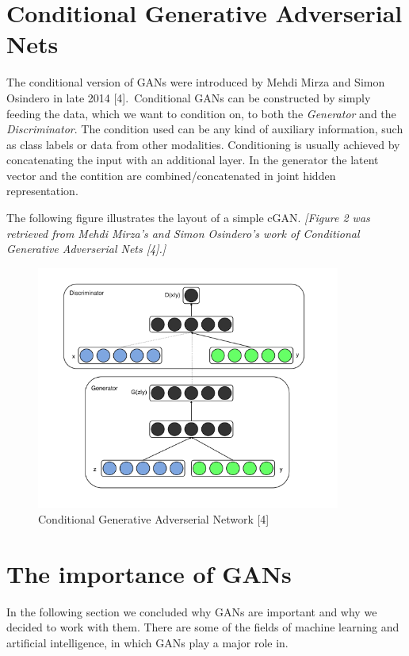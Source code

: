 \documentclass[lettersize,journal]{IEEEtran}
\begin{document}
\section{Conditional Generative Adverserial Nets}
The conditional version of GANs were introduced by Mehdi Mirza and Simon Osindero in late 2014 [4].\  Conditional GANs can be constructed by simply feeding the data, which we want to condition on, to both the \textit{Generator} and the \textit{Discriminator}. The condition used can be any kind of auxiliary information, such as class labels or data from other modalities. Conditioning is usually achieved by concatenating the input with an additional layer. In the generator the latent vector and the contition are combined/concatenated in joint hidden representation.

\vspace*{1em}The following figure illustrates the layout of a simple cGAN.\newline
\textit{[Figure 2 was retrieved from Mehdi Mirza's and Simon Osindero's work of Conditional Generative Adverserial Nets [4].]}

\begin{figure}[h]
    \centering
    \includegraphics[width=10cm]{CGAN_layout}
    \caption{Conditional Generative Adverserial Network [4]}
    \label{fig_2}
\end{figure}
\newpage



\section{The importance of GANs}
In the following section we concluded why GANs are important and why we decided to work with them. There are some of the fields of machine learning and artificial intelligence, in which GANs play a major role in.
\end{document}
